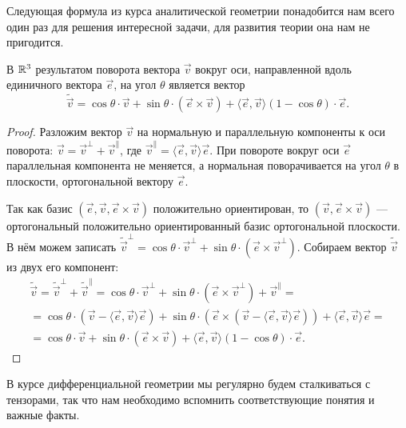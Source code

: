 Следующая формула из курса аналитической геометрии понадобится нам всего один раз для решения интересной задачи, для развития теории она нам не пригодится.

\begin{lemma}
	В $\mathbb{R}^3$ результатом поворота вектора $\vec{v}$ вокруг оси, направленной вдоль единичного вектора $\vec{e}$, на угол $\theta$ является вектор
	\begin{equation} \label{eq:RodrigaR3}
		\widetilde{\vec{v}} = \cos\theta \cdot \vec{v} + \sin\theta \cdot (\vec{e} \times \vec{v}) + \langle\vec{e}, \vec{v}\rangle(1 - \cos\theta) \cdot \vec{e}.
	\end{equation}
\end{lemma}

\begin{proof}
	Разложим вектор $\vec{v}$ на нормальную и параллельную компоненты к оси поворота: $\vec{v} = \vec{v}^\perp + \vec{v}^\parallel$, где $\vec{v}^\parallel = \langle\vec{e}, \vec{v}\rangle\vec{e}$. При повороте вокруг оси $\vec{e}$ параллельная компонента не меняется, а нормальная поворачивается на угол $\theta$ в плоскости, ортогональной вектору $\vec{e}$.

	Так как базис $(\vec{e}, \vec{v}, \vec{e} \times \vec{v})$ положительно ориентирован, то $(\vec{v}, \vec{e} \times \vec{v})$ --- ортогональный положительно ориентированный базис ортогональной плоскости. В нём можем записать $\widetilde{\vec{v}}^\perp = \cos\theta \cdot \vec{v}^\perp + \sin\theta \cdot (\vec{e} \times \vec{v}^\perp)$. Собираем вектор $\widetilde{\vec{v}}$ из двух его компонент:
	\begin{multline*}
		\widetilde{\vec{v}} = \widetilde{\vec{v}}^\perp + \widetilde{\vec{v}}^\parallel = \cos\theta \cdot \vec{v}^\perp + \sin\theta \cdot (\vec{e} \times \vec{v}^\perp) + \vec{v}^\parallel =\\ = \cos\theta \cdot (\vec{v} - \langle\vec{e}, \vec{v}\rangle\vec{e}) + \sin\theta \cdot (\vec{e} \times (\vec{v} - \langle\vec{e}, \vec{v}\rangle\vec{e})) + \langle\vec{e}, \vec{v}\rangle\vec{e} =\\ = \cos\theta \cdot \vec{v} + \sin\theta \cdot (\vec{e} \times \vec{v}) + \langle\vec{e}, \vec{v}\rangle(1 - \cos\theta) \cdot \vec{e}.
	\end{multline*}
\end{proof}

В курсе дифференциальной геометрии мы регулярно будем сталкиваться с тензорами, так что нам необходимо вспомнить соответствующие понятия и важные факты.

